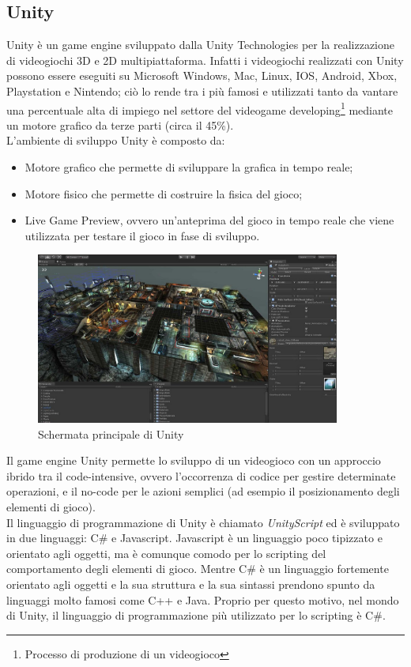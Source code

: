 \documentclass[12pt,a4paper,openright,twoside]{book}
\begin{document}
	\subsection{Unity}
	Unity è un game engine sviluppato dalla Unity Technologies per la realizzazione di videogiochi 3D e 2D multipiattaforma. Infatti i videogiochi realizzati con Unity possono essere eseguiti su Microsoft Windows, Mac, Linux, IOS, Android, Xbox, Playstation e Nintendo; ciò lo rende tra i più famosi e utilizzati tanto da vantare una percentuale alta di impiego nel settore del videogame developing\footnote{Processo di produzione di un videogioco} mediante un motore grafico da terze parti (circa il 45\%).\\
	L'ambiente di sviluppo Unity è composto da:
	\begin{itemize}
		\item Motore grafico che permette di sviluppare la grafica in tempo reale;
		\item Motore fisico che permette di costruire la fisica del gioco;
		\item Live Game Preview, ovvero un'anteprima del gioco in tempo reale che viene utilizzata per testare il gioco in fase di sviluppo.
	\end{itemize}
	\begin{figure}[h]
	\centering
	\includegraphics[width=100mm]{unity3D.jpg}
	\caption{Schermata principale di Unity}
	\label{fig:unity3d}
    \end{figure}
    Il game engine Unity permette lo sviluppo di un videogioco con un approccio ibrido tra il code-intensive, ovvero l'occorrenza di codice per gestire determinate operazioni, e il no-code per le azioni semplici (ad esempio il posizionamento degli elementi di gioco).\\
	Il linguaggio di programmazione di Unity è chiamato \textit{UnityScript} ed è sviluppato in due linguaggi: C\# e Javascript. Javascript è un linguaggio poco tipizzato e orientato agli oggetti, ma è comunque comodo per lo scripting del comportamento degli elementi di gioco. Mentre C\# è un linguaggio fortemente orientato agli oggetti e la sua struttura e la sua sintassi prendono spunto da linguaggi molto famosi come C++ e Java. Proprio per questo motivo, nel mondo di Unity, il linguaggio di programmazione più utilizzato per lo scripting è C\#.\\
\end{document}

